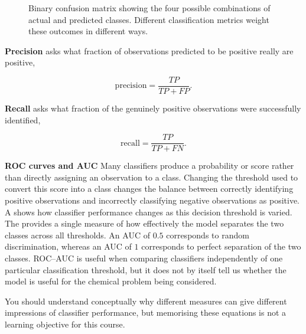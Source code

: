 \begin{figure}[htbp]
{%
}


    \caption{
        Binary confusion matrix showing the four possible combinations of
        actual and predicted classes.
        Different classification metrics weight these outcomes in different ways.
    }
    \label{fig2-10:confusion-matrix}
\end{figure}

\begin{notebox}

  \textbf{Precision} asks what fraction of observations predicted to be positive really are positive,

  \begin{equation}
    \mathrm{precision} = \frac{TP}{TP + FP}.
  \end{equation}

  \textbf{Recall} asks what fraction of the genuinely positive observations were successfully identified,

  \begin{equation}
    \mathrm{recall} = \frac{TP}{TP + FN}.
  \end{equation}

  \textbf{ROC curves and AUC} Many classifiers produce a probability or score rather than directly assigning an observation to a class.
  Changing the threshold used to convert this score into a class changes the balance between correctly identifying positive observations and incorrectly classifying negative observations as positive.
  A  shows how classifier performance changes as this decision threshold is varied.
  The  provides a single measure of how effectively the model separates the two classes across all thresholds.
  An AUC of \(0.5\) corresponds to random discrimination, whereas an AUC of \(1\) corresponds to perfect separation of the two classes.
  ROC--AUC is useful when comparing classifiers independently of one particular classification threshold, but it does not by itself tell us whether the model is useful for the chemical problem being considered.

  You should understand conceptually why different measures can give different impressions of classifier performance, but memorising these equations is not a learning objective for this course.
\end{notebox}

